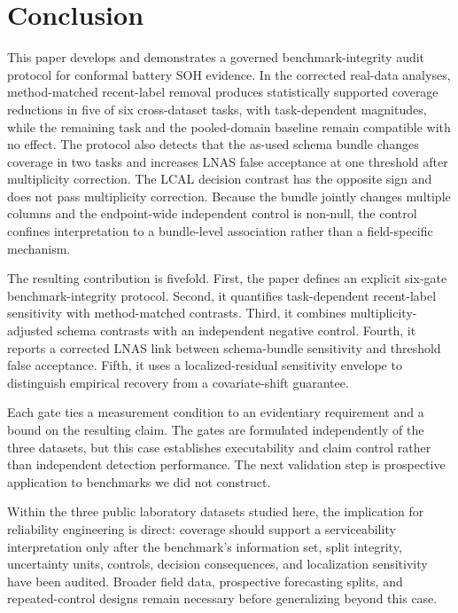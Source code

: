\documentclass[
  number,
  preprint]{elsarticle}
\begin{document}
\section{Conclusion}\label{sec-conclusion}

This paper develops and demonstrates a governed benchmark-integrity
audit protocol for conformal battery SOH evidence. In the corrected
real-data analyses, method-matched recent-label removal produces
statistically supported coverage reductions in five of six cross-dataset
tasks, with task-dependent magnitudes, while the remaining task and the
pooled-domain baseline remain compatible with no effect. The protocol
also detects that the as-used schema bundle changes coverage in two
tasks and increases LNAS false acceptance at one threshold after
multiplicity correction. The LCAL decision contrast has the opposite
sign and does not pass multiplicity correction. Because the bundle
jointly changes multiple columns and the endpoint-wide independent
control is non-null, the control confines interpretation to a
bundle-level association rather than a field-specific mechanism.

The resulting contribution is fivefold. First, the paper defines an
explicit six-gate benchmark-integrity protocol. Second, it quantifies
task-dependent recent-label sensitivity with method-matched contrasts.
Third, it combines multiplicity-adjusted schema contrasts with an
independent negative control. Fourth, it reports a corrected LNAS link
between schema-bundle sensitivity and threshold false acceptance. Fifth,
it uses a localized-residual sensitivity envelope to distinguish
empirical recovery from a covariate-shift guarantee.

Each gate ties a measurement condition to an evidentiary requirement and
a bound on the resulting claim. The gates are formulated independently
of the three datasets, but this case establishes executability and claim
control rather than independent detection performance. The next
validation step is prospective application to benchmarks we did not
construct.

Within the three public laboratory datasets studied here, the
implication for reliability engineering is direct: coverage should
support a serviceability interpretation only after the benchmark's
information set, split integrity, uncertainty units, controls, decision
consequences, and localization sensitivity have been audited. Broader
field data, prospective forecasting splits, and repeated-control designs
remain necessary before generalizing beyond this case.
\end{document}
